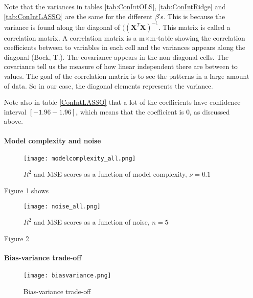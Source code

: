 \documentclass[a4paper]{article}
\begin{document}
Note that the variances in tables \ref{tab:ConIntOLS}, \ref{tab:ConIntRidge} and \ref{tab:ConIntLASSO} are the same for the different $\beta$'s. This is because the variance is found along the diagonal of $((\textbf{X}^{T}\textbf{X})^{-1}$. This matrix is called a correlation matrix. A correlation matrix is a m$\times$m-table showing the correlation coefficients between to variables in each cell and the variances appears along the diagonal (Bock, T.). The covariance appears in the non-diagonal cells. The covariance tell us the measure of how linear independent there are between to values. The goal of the correlation matrix is to see the patterns in a large amount of data. So in our case, the diagonal elements represents the variance.

Note also in table \ref{ConIntLASSO} that a lot of the coefficients have confidence interval $[-1.96 - 1.96]$, which means that the coefficient is 0, as discussed above.


\paragraph{Model complexity and noise}

\begin{figure}[h!]
\centering
  \texttt{[image: modelcomplexity\_all.png]}
  \caption{$R^{2}$ and MSE scores as a function of model complexity, $\nu = 0.1$}
  \label{fig:ModCompALL}
\end{figure}

Figure \ref{fig:ModCompALL} shows

\begin{figure}[h!]
\centering
  \texttt{[image: noise\_all.png]}
  \caption{$R^{2}$ and MSE scores as a function of noise, $n = 5$}
  \label{fig:noiseALL}
\end{figure}

Figure \ref{fig:noiseALL}

\paragraph{Bias-variance trade-off}

\begin{figure}[h!]
\centering
  \texttt{[image: biasvariance.png]}
  \caption{Bias-variance trade-off}
  \label{fig:biasvariance}
\end{figure}
\end{document}
